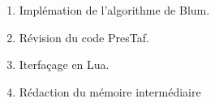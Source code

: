 \documentclass{article}%
\begin{document}

\begin{enumerate}
\item Implémation de l'algorithme de Blum.
\item Révision du code PresTaf.
\item Iterfaçage en Lua.
\item Rédaction du mémoire intermédiaire
\end{enumerate}


\appendix

{}


\printglossaries

\end{document}
